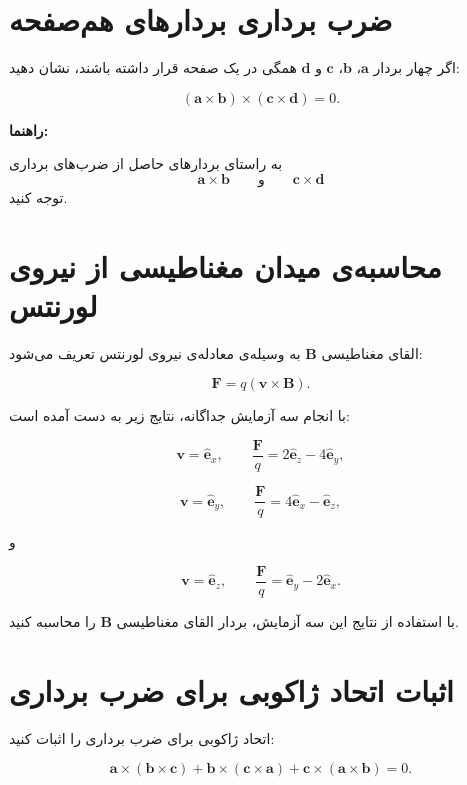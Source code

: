 \documentclass[a4paper,16pt]{article}
\begin{document}
\section{ضرب برداری بردارهای هم‌صفحه}

اگر چهار بردار $\mathbf{a}$، $\mathbf{b}$، $\mathbf{c}$ و $\mathbf{d}$ همگی در یک صفحه قرار داشته باشند، نشان دهید:

\[
(\mathbf{a}\times\mathbf{b})
\times
(\mathbf{c}\times\mathbf{d})
=
0.
\]

\textbf{راهنما:}

به راستای بردارهای حاصل از ضرب‌های برداری
\[
\mathbf{a}\times\mathbf{b}
\qquad\text{و}\qquad
\mathbf{c}\times\mathbf{d}
\]
توجه کنید.



\section{محاسبه‌ی میدان مغناطیسی از نیروی لورنتس}

القای مغناطیسی $\mathbf{B}$ به وسیله‌ی معادله‌ی نیروی لورنتس تعریف می‌شود:

\[
\mathbf{F}
=
q(\mathbf{v}\times\mathbf{B}).
\]

با انجام سه آزمایش جداگانه، نتایج زیر به دست آمده است:

\[
\mathbf{v}
=
\hat{\mathbf e}_x,
\qquad
\frac{\mathbf{F}}{q}
=
2\hat{\mathbf e}_z
-
4\hat{\mathbf e}_y,
\]

\[
\mathbf{v}
=
\hat{\mathbf e}_y,
\qquad
\frac{\mathbf{F}}{q}
=
4\hat{\mathbf e}_x
-
\hat{\mathbf e}_z,
\]

و

\[
\mathbf{v}
=
\hat{\mathbf e}_z,
\qquad
\frac{\mathbf{F}}{q}
=
\hat{\mathbf e}_y
-
2\hat{\mathbf e}_x.
\]

با استفاده از نتایج این سه آزمایش، بردار القای مغناطیسی $\mathbf{B}$ را محاسبه کنید.



\section{اثبات اتحاد ژاکوبی برای ضرب برداری}

اتحاد ژاکوبی برای ضرب برداری را اثبات کنید:

\[
\mathbf{a}\times(\mathbf{b}\times\mathbf{c})
+
\mathbf{b}\times(\mathbf{c}\times\mathbf{a})
+
\mathbf{c}\times(\mathbf{a}\times\mathbf{b})
=
0.
\]
\end{document}
